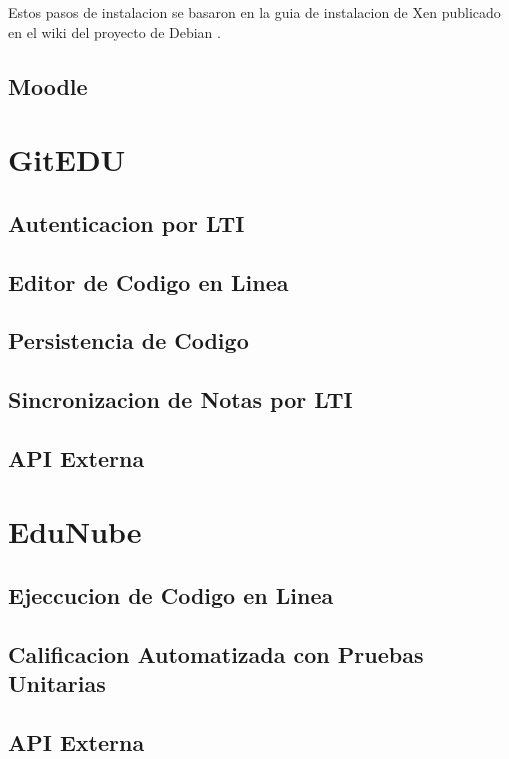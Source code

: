 Estos pasos de instalacion se basaron en la guia de instalacion de Xen publicado en el wiki del proyecto de Debian \citep{Debian-Wiki-Xen}.

\subsection{Moodle}

\section{GitEDU}

\subsection{Autenticacion por LTI}

\subsection{Editor de Codigo en Linea}

\subsection{Persistencia de Codigo}

\subsection{Sincronizacion de Notas por LTI}

\subsection{API Externa}

\section{EduNube}

\subsection{Ejeccucion de Codigo en Linea}

\subsection{Calificacion Automatizada con Pruebas Unitarias}

\subsection{API Externa}
